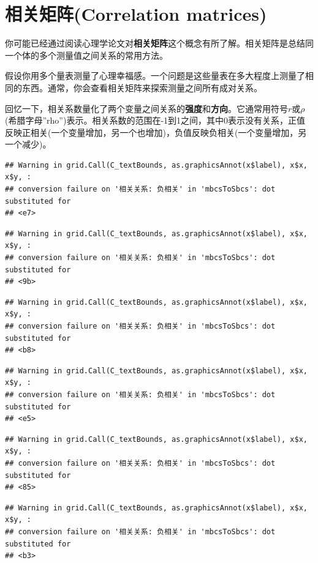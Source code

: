 \documentclass[
]{book}
\begin{document}
\hypertarget{ux76f8ux5173ux77e9ux9635correlation-matrices}{%
\section{相关矩阵(Correlation matrices)}\label{ux76f8ux5173ux77e9ux9635correlation-matrices}}

你可能已经通过阅读心理学论文对\textbf{相关矩阵}这个概念有所了解。相关矩阵是总结同一个体的多个测量值之间关系的常用方法。

假设你用多个量表测量了心理幸福感。一个问题是这些量表在多大程度上测量了相同的东西。通常，你会查看相关矩阵来探索测量之间所有成对关系。

回忆一下，相关系数量化了两个变量之间关系的\textbf{强度}和\textbf{方向}。它通常用符号\(r\)或\(\rho\)(希腊字母''rho'')表示。相关系数的范围在-1到1之间，其中0表示没有关系，正值反映正相关(一个变量增加，另一个也增加)，负值反映负相关(一个变量增加，另一个减少)。

\begin{verbatim}
## Warning in grid.Call(C_textBounds, as.graphicsAnnot(x$label), x$x, x$y, :
## conversion failure on '相关关系: 负相关' in 'mbcsToSbcs': dot substituted for
## <e7>
\end{verbatim}

\begin{verbatim}
## Warning in grid.Call(C_textBounds, as.graphicsAnnot(x$label), x$x, x$y, :
## conversion failure on '相关关系: 负相关' in 'mbcsToSbcs': dot substituted for
## <9b>
\end{verbatim}

\begin{verbatim}
## Warning in grid.Call(C_textBounds, as.graphicsAnnot(x$label), x$x, x$y, :
## conversion failure on '相关关系: 负相关' in 'mbcsToSbcs': dot substituted for
## <b8>
\end{verbatim}

\begin{verbatim}
## Warning in grid.Call(C_textBounds, as.graphicsAnnot(x$label), x$x, x$y, :
## conversion failure on '相关关系: 负相关' in 'mbcsToSbcs': dot substituted for
## <e5>
\end{verbatim}

\begin{verbatim}
## Warning in grid.Call(C_textBounds, as.graphicsAnnot(x$label), x$x, x$y, :
## conversion failure on '相关关系: 负相关' in 'mbcsToSbcs': dot substituted for
## <85>
\end{verbatim}

\begin{verbatim}
## Warning in grid.Call(C_textBounds, as.graphicsAnnot(x$label), x$x, x$y, :
## conversion failure on '相关关系: 负相关' in 'mbcsToSbcs': dot substituted for
## <b3>
\end{verbatim}
\end{document}
